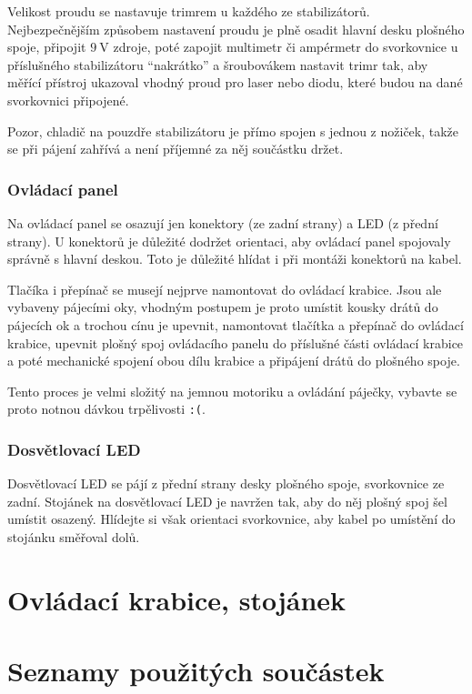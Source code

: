 \documentclass[twoside,project,skipblank]{../MFFPrace}
\begin{document}
Velikost proudu se nastavuje trimrem u každého ze stabilizátorů. Nejbezpečnějším způsobem nastavení proudu je plně osadit hlavní desku plošného spoje, připojit $9\:\text{V}$ zdroje, poté zapojit multimetr či ampérmetr do svorkovnice u příslušného stabilizátoru "`nakrátko"' a šroubovákem nastavit trimr tak, aby měřící přístroj ukazoval vhodný proud pro laser nebo diodu, které budou na dané svorkovnici připojené.

Pozor, chladič na pouzdře stabilizátoru je přímo spojen s jednou z nožiček, takže se při pájení zahřívá a není příjemné za něj součástku držet.

\subsubsection{Ovládací panel}
Na ovládací panel se osazují jen konektory (ze zadní strany) a LED (z přední strany). U konektorů je důležité dodržet orientaci, aby ovládací panel spojovaly správně s hlavní deskou. Toto je důležité hlídat i při montáži konektorů na kabel.

Tlačíka i přepínač se musejí nejprve namontovat do ovládací krabice. Jsou ale vybaveny pájecími oky, vhodným postupem je proto umístit kousky drátů do pájecích ok a trochou cínu je upevnit, namontovat tlačítka a přepínač do ovládací krabice, upevnit plošný spoj ovládacího panelu do příslušné části ovládací krabice a poté mechanické spojení obou dílu krabice a připájení drátů do plošného spoje.

Tento proces je velmi složitý na jemnou motoriku a ovládání páječky, vybavte se proto notnou dávkou trpělivosti \texttt{:(}.

\subsubsection{Dosvětlovací LED}
Dosvětlovací LED se pájí z přední strany desky plošného spoje, svorkovnice ze zadní. Stojánek na dosvětlovací LED je navržen tak, aby do něj plošný spoj šel umístit osazený. Hlídejte si však orientaci svorkovnice, aby kabel po umístění do stojánku směřoval dolů.

\section{Ovládací krabice, stojánek}

\section{Seznamy použitých součástek}
\end{document}
